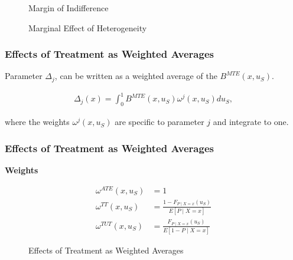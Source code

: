 \begin{frame}
\begin{figure}\caption{Margin of Indifference}
\end{figure}
\end{frame}


\begin{frame}

\begin{figure}\caption{Marginal Effect of Heterogeneity}
\end{figure}

\end{frame}


\begin{frame}
\frametitle{Effects of Treatment as Weighted Averages}

Parameter \(\Delta_j\), can be written as a weighted average of the
\(B^{MTE}(x, u_S)\).

\begin{align*}
\Delta_j(x) = \int_0^1 B^{MTE}(x, u_S) \omega^j(x, u_S) du_S,
\end{align*}

where the weights \(\omega^j(x, u_S)\) are specific to parameter \(j\)
and integrate to one.
\end{frame}

\begin{frame}
\frametitle{Effects of Treatment as Weighted Averages}
\textbf{Weights}

\begin{align*}
 \omega^{ATE}(x, u_S) & = 1 \\
 \omega^{TT}(x, u_S) & = \frac{1 - F_{P\mid X=x}(u_S)}{E[P \mid X = x]}\\
 \omega^{TUT}(x, u_S) & = \frac{F_{P\mid X=x}(u_S)}{E[1 - P \mid X = x]}
\end{align*}

\end{frame}


\begin{frame}
\begin{figure}\caption{Effects of Treatment as Weighted Averages}
\end{figure}
\end{frame}

